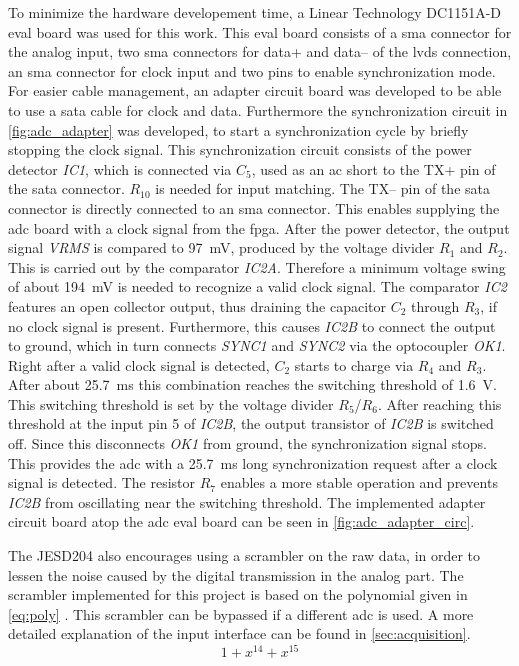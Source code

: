 \documentclass[12pt,a4paper,parskip=full,abstract=true,BCOR=12mm,twoside,open=right]{scrreprt}
\def\device#1{\textit{#1}}
\begin{document}
To minimize the hardware developement time, a Linear Technology DC1151A-D eval board was used
for this work. This eval board consists of a \gls{sma} connector for the analog input, two \gls{sma}
connectors for data+ and data-- of the \gls{lvds} connection, an \gls{sma} connector for clock input
and two pins to enable synchronization mode. For easier cable management, an adapter circuit
board was developed to be able to use a \gls{sata} cable for clock and data. Furthermore the synchronization
circuit in \cref{fig:adc_adapter} was developed, to start a synchronization cycle by briefly stopping the clock
signal. This synchronization circuit consists of the power detector \device{IC1}, which is connected
via \device{$C_5$}, used as an \gls{ac} short to the TX+
pin of the \gls{sata} connector. \device{$R_{10}$} is needed for input matching. The TX-- pin of the \gls{sata} connector is directly connected to
an \gls{sma} connector. This enables supplying the \gls{adc} board with a clock signal from the \gls{fpga}. After
the power detector, the output signal \device{VRMS} is compared to \SI{97}{\milli\volt},
produced by the voltage divider $R_1$ and $R_2$. This is carried out by the comparator \device{IC2A}. Therefore a minimum voltage
swing of about \SI{194}{\milli\volt} is needed to recognize a valid clock signal. The comparator
\device{IC2} features an open collector output, thus draining the capacitor $C_2$ through
$R_3$, if no clock signal is present. Furthermore, this causes \device{IC2B} to connect the output
to ground, which in turn connects \device{SYNC1} and \device{SYNC2} via the optocoupler \device{OK1}.
Right after a valid clock signal is detected, $C_2$ starts to charge via $R_4$ and $R_3$. After
about \SI{25.7}{\milli\second} this combination reaches the switching threshold of \SI{1.6}{\volt}. This
switching threshold is set by the voltage divider $R_5$/$R_6$. After reaching this threshold at the input pin 5 of \device{IC2B},
the output transistor of \device{IC2B} is switched off. Since this disconnects \device{OK1} from ground, the synchronization
signal stops.  This provides the \gls{adc} with a \SI{25.7}{\milli\second} long synchronization
request after a clock signal is detected. The resistor $R_7$ enables a more stable operation and prevents \device{IC2B} from
oscillating near the switching threshold. The implemented adapter circuit board atop the \gls{adc}
eval board can be seen in \cref{fig:adc_adapter_circ}.

The JESD204 also encourages using a scrambler on the raw data, in order to lessen the
noise caused by the digital transmission in the analog part. The scrambler implemented for
this project is based on the polynomial given in \cref{eq:poly} \cite{jesd205B.01}. This scrambler can
be bypassed if a different \gls{adc} is used. A more detailed explanation of the input interface
can be found in \cref{sec:acquisition}.
\begin{equation}
    \label{eq:poly} 1 + x^{14} + x^{15}
\end{equation}
\end{document}
